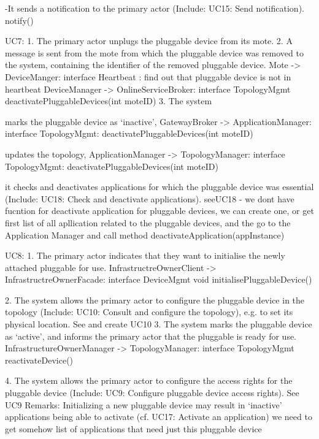             -It sends a notification to the primary actor (Include: UC15: Send notification).
            notify()
        

        
     UC7:
        1. The primary actor unplugs the pluggable device from its mote.
        2. A message is sent from the mote from which the pluggable device was removed to the system,
            containing the identifier of the removed pluggable device.
            Mote -> DeviceManger: interface Heartbeat : find out that pluggable device is not in heartbeat
            DeviceManager -> OnlineServiceBroker: interface TopologyMgmt deactivatePluggableDevices(int moteID)
        3. The system
        { marks the pluggable device as `inactive',
           GatewayBroker -> ApplicationManager: interface TopologyMgmt: deactivatePluggableDevices(int moteID)
        { updates the topology,
           ApplicationManager -> TopologyManager: interface TopologyMgmt: deactivatePluggableDevices(int moteID)
        { it checks and deactivates applications for which the pluggable device was essential
        (Include: UC18: Check and deactivate applications).
        seeUC18 - we dont have fucntion for deactivate application for pluggable devices, we can create one, or get 
                            first list of all apllication related to the pluggable devices, and the go to the Application Manager and 
                            call method deactivateApplication(appInstance)
        
     UC8:
        1. The primary actor indicates that they want to initialise the newly attached pluggable for use.
            InfrastructreOwnerClient -> InfrastructreOwnerFacade: interface DeviceMgmt
                                void initialisePluggableDevice()
                                        
        2. The system allows the primary actor to configure the pluggable device in the topology
            (Include: UC10: Consult and configure the topology), e.g. to set its physical location.
             See and create UC10
        3. The system marks the pluggable device as `active', and informs the primary actor that the
            pluggable is ready for use.
            InfrastructureOwnerManager -> TopologyManager: interface TopologyMgmt reactivateDevice()
            
        4. The system allows the primary actor to configure the access rights for the pluggable device
            (Include: UC9: Configure pluggable device access rights).
            See UC9
         Remarks:
            Initializing a new pluggable device may result in `inactive' applications being able to activate
            (cf. UC17: Activate an application) we need to get somehow list of applications that need just this pluggable device
            
}}}
